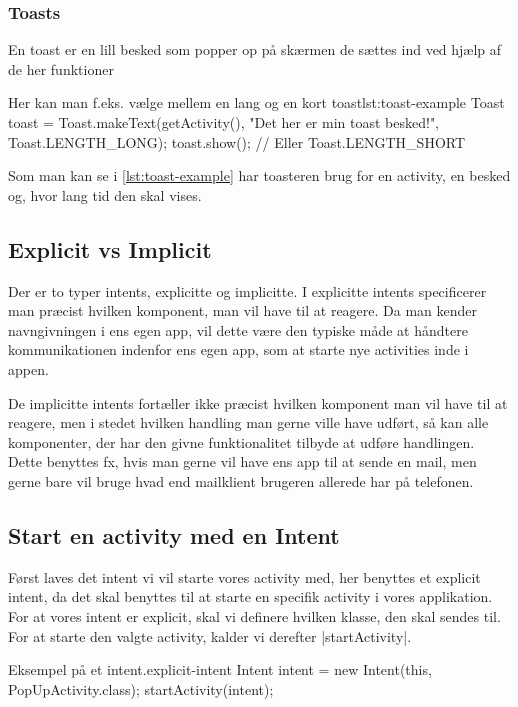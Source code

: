 \subsubsection{Toasts}

En toast er en lill besked som popper op på skærmen de sættes ind ved hjælp af de her funktioner  

\begin{JavaCode}{Her kan man f.eks. vælge mellem en lang og en kort toast}{lst:toast-example}
	Toast toast = Toast.makeText(getActivity(), 
								"Det her er min toast besked!",
								Toast.LENGTH_LONG);
	toast.show();
	// Eller Toast.LENGTH_SHORT
\end{JavaCode}

Som man kan se i \autoref{lst:toast-example} har toasteren brug for en activity, en besked og, hvor lang tid den skal vises.

\subsection{Explicit vs Implicit}

Der er to typer intents, explicitte og implicitte. I explicitte intents specificerer man præcist hvilken komponent, man vil have til at reagere. Da man kender navngivningen i ens egen app, vil dette være den typiske måde at håndtere kommunikationen indenfor ens egen app, som at starte nye activities inde i appen.

De implicitte intents fortæller ikke præcist hvilken komponent man vil have til at reagere, men i stedet hvilken handling man gerne ville have udført, så kan alle komponenter, der har den givne funktionalitet tilbyde at udføre handlingen. Dette benyttes fx, hvis man gerne vil have ens app til at sende en mail, men gerne bare vil bruge hvad end mailklient brugeren allerede har på telefonen.

\subsection{Start en activity med en Intent}

Først laves det intent vi vil starte vores activity med, her benyttes et explicit intent, da det skal benyttes til at starte en specifik activity i vores applikation. For at vores intent er explicit, skal vi definere hvilken klasse, den skal sendes til. For at starte den valgte activity, kalder vi derefter \JavaInline|startActivity|.

\begin{JavaCode}{Eksempel på et intent.}{explicit-intent}
	Intent intent = new Intent(this, PopUpActivity.class);
	startActivity(intent);
\end{JavaCode}

